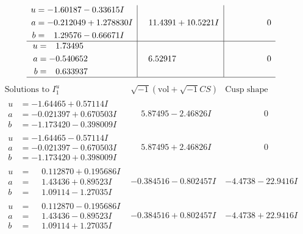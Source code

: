 \documentclass[1p]{elsarticle_modified}
\theoremstyle{definition}
\newcommand{\I}{\sqrt{-1}}
\begin{document}
$$\begin{array}{c|c|c}
\begin{aligned}
u &= -1.60187 - 0.33615 I \\
a &= -0.212049 + 1.278830 I \\
b &= \phantom{-}1.29576 - 0.66671 I\end{aligned}
 & \phantom{-}11.4391 + 10.5221 I & \phantom{-0.000000 } 0 \\ \hline\begin{aligned}
u &= \phantom{-}1.73495\phantom{ +0.000000I} \\
a &= -0.540652\phantom{ +0.000000I} \\
b &= \phantom{-}0.633937\phantom{ +0.000000I}\end{aligned}
 & \phantom{-}6.52917\phantom{ +0.000000I} & \phantom{-0.000000 } 0\\
 \hline 
 \end{array}$$\newpage$$\begin{array}{c|c|c}  
\text{Solutions to }I^u_{1}& \I (\text{vol} + \sqrt{-1}CS) & \text{Cusp shape}\\
 \hline 
\begin{aligned}
u &= -1.64465 + 0.57114 I \\
a &= -0.021397 + 0.670503 I \\
b &= -1.173420 - 0.398009 I\end{aligned}
 & \phantom{-}5.87495 - 2.46826 I & \phantom{-0.000000 } 0 \\ \hline\begin{aligned}
u &= -1.64465 - 0.57114 I \\
a &= -0.021397 - 0.670503 I \\
b &= -1.173420 + 0.398009 I\end{aligned}
 & \phantom{-}5.87495 + 2.46826 I & \phantom{-0.000000 } 0 \\ \hline\begin{aligned}
u &= \phantom{-}0.112870 + 0.195686 I \\
a &= \phantom{-}1.43436 + 0.89523 I \\
b &= \phantom{-}1.09114 - 1.27035 I\end{aligned}
 & -0.384516 - 0.802457 I & -4.4738 - 22.9416 I \\ \hline\begin{aligned}
u &= \phantom{-}0.112870 - 0.195686 I \\
a &= \phantom{-}1.43436 - 0.89523 I \\
b &= \phantom{-}1.09114 + 1.27035 I\end{aligned}
 & -0.384516 + 0.802457 I & -4.4738 + 22.9416 I \\ \hline\begin{aligned}

\end{aligned}
\end{array}$$
\end{document}
